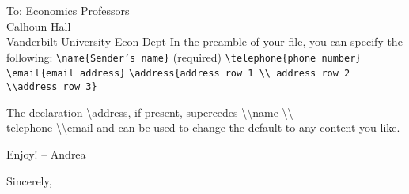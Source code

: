 \documentclass[color-logo]{letter}
\begin{document}
\begin{letter}{
To: Economics Professors\\
Calhoun Hall \\
Vanderbilt University Econ Dept}
In the preamble of your file, you can specify the following:\newline
\newline
\texttt{\textbackslash name\{Sender's name\}} (required) \newline
\texttt{\textbackslash telephone\{phone number\}} \newline
\texttt{\textbackslash email\{email address\}}\newline
\texttt{\textbackslash address\{address row 1 \textbackslash \textbackslash 
address row 2 \textbackslash \textbackslash  address row 3\}}

The declaration \textbackslash address, if present, supercedes 
\textbackslash \textbackslash name \textbackslash \textbackslash 
\\telephone \textbackslash \textbackslash email and can be used to change the
default to any content you like.\bigskip




Enjoy! -- Andrea

\closing{
Sincerely,
}

\end{letter}
\end{document}
